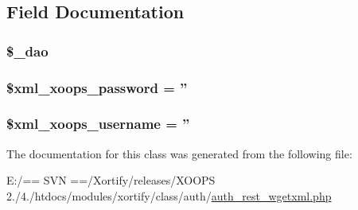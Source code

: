 \subsection{Field Documentation}
\hypertarget{class_xortify_auth_rest___wgetxml_a12a029c610f699b4b25e79a1f64a3485}{
\subsubsection[{\$\-\_\-dao}]{\setlength{\rightskip}{0pt plus 5cm}\$\-\_\-dao}}\label{class_xortify_auth_rest___wgetxml_a12a029c610f699b4b25e79a1f64a3485}
\hypertarget{class_xortify_auth_rest___wgetxml_a8ec2889165c837354fded1cedbd42157}{
\subsubsection[{\$xml\-\_\-xoops\-\_\-password}]{\setlength{\rightskip}{0pt plus 5cm}\$xml\-\_\-xoops\-\_\-password = ''}}\label{class_xortify_auth_rest___wgetxml_a8ec2889165c837354fded1cedbd42157}
\hypertarget{class_xortify_auth_rest___wgetxml_a725df0dd6b578e15522ed15945e5901c}{
\subsubsection[{\$xml\-\_\-xoops\-\_\-username}]{\setlength{\rightskip}{0pt plus 5cm}\$xml\-\_\-xoops\-\_\-username = ''}}\label{class_xortify_auth_rest___wgetxml_a725df0dd6b578e15522ed15945e5901c}


The documentation for this class was generated from the following file\-:\begin{DoxyCompactItemize}
\item 
E\-:/== S\-V\-N ==/\-Xortify/releases/\-X\-O\-O\-P\-S 2./4./htdocs/modules/xortify/class/auth/\hyperlink{auth__rest__wgetxml_8php}{auth\-\_\-rest\-\_\-wgetxml.\-php}\end{DoxyCompactItemize}
